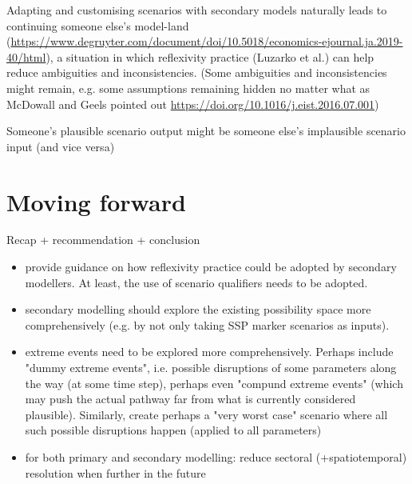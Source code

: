 \documentclass{article}
\begin{document}
\begin{refsection}
Adapting and customising scenarios with secondary models naturally leads to continuing someone else's model-land (\url{https://www.degruyter.com/document/doi/10.5018/economics-ejournal.ja.2019-40/html}), a situation in which reflexivity practice (Luzarko et al.) can help reduce ambiguities and inconsistencies. (Some ambiguities and inconsistencies might remain, e.g. some assumptions remaining hidden no matter what as McDowall and Geels pointed out \url{https://doi.org/10.1016/j.eist.2016.07.001})

Someone's plausible scenario output might be someone else's implausible scenario input (and vice versa)


\section{Moving forward}

Recap + recommendation + conclusion

\begin{itemize}
    \item provide guidance on how reflexivity practice could be adopted by secondary modellers. At least, the use of scenario qualifiers needs to be adopted.
    \item secondary modelling should explore the existing possibility space more comprehensively (e.g. by not only taking SSP marker scenarios as inputs).
    \item extreme events need to be explored more comprehensively. Perhaps include "dummy extreme events", i.e. possible disruptions of some parameters along the way (at some time step), perhaps even "compund extreme events" (which may push the actual pathway far from what is currently considered plausible). Similarly, create perhaps a "very worst case" scenario where all such possible disruptions happen (applied to all parameters)
    \item for both primary and secondary modelling: reduce sectoral (+spatiotemporal) resolution when further in the future
\end{itemize}

\newrefcontext[sorting=nyt] %
\printbibliography[heading = bibintoc] %

\end{refsection}
\end{document}
